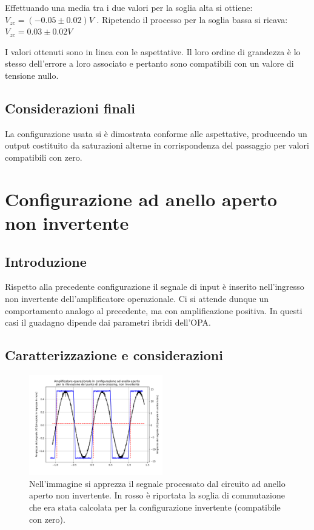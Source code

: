 \documentclass[journal]{IEEEtran}
\begin{document}
Effettuando una media tra i due valori per la soglia alta si ottiene: $V_{zc} = (-0.05 \pm 0.02) V$ .
Ripetendo il processo per la soglia bassa si ricava: $V_{zc} = 0.03 \pm 0.02 V$

I valori ottenuti sono in linea con le aspettative. Il loro ordine di grandezza è lo stesso dell'errore a loro associato e pertanto sono compatibili con un valore di tensione nullo.

\subsection{\textbf{Considerazioni finali}}
La configurazione usata si è dimostrata conforme alle aspettative, producendo un output costituito da saturazioni alterne in corrispondenza del passaggio per valori compatibili con zero. 

\section{\textbf{Configurazione ad anello aperto non invertente}} %
\subsection{\textbf{Introduzione}}

Rispetto alla precedente configurazione il segnale di input è inserito nell'ingresso non invertente dell'amplificatore operazionale.
Ci si attende dunque un comportamento analogo al precedente, ma con amplificazione positiva. In questi casi il guadagno dipende dai parametri ibridi dell'OPA.

\subsection{\textbf{Caratterizzazione e considerazioni}}

\begin{figure}[H]%
\begin {center}
\includegraphics[width=0.52\textwidth]{analysis/output/OPA-open-loop-non-inv-zero-crossing-z2.pdf}
\caption{Nell'immagine si apprezza il segnale processato dal circuito ad anello aperto non invertente. In rosso è riportata la soglia di commutazione che era stata calcolata per la configurazione invertente (compatibile con zero).}
\label{fig:open_loop_non_inv_zc}
\end {center}
\end{figure}
\end{document}
